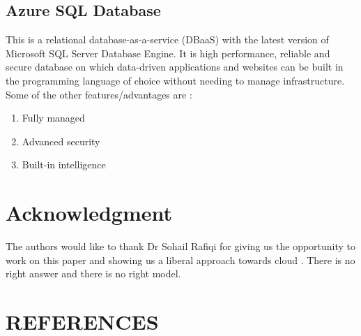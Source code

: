 \documentclass[journal]{hybrid-cloud}
\begin{document}
\subsection{Azure SQL Database}
This is a relational database-as-a-service (DBaaS) with the latest version of Microsoft SQL Server Database Engine. It is high performance, reliable and secure database on which data-driven applications and websites can be built in the programming language of choice without needing to manage infrastructure. Some of the other features/advantages are :

\begin{enumerate}
	\item Fully managed
	\item Advanced security
	\item Built-in intelligence
\end{enumerate}



\section*{Acknowledgment}


The authors would like to thank Dr Sohail Rafiqi for giving us the opportunity to work on this paper and showing us a liberal approach towards cloud . There is no right answer and there is no right model. 

\ifCLASSOPTIONcaptionsoff
  \newpage
\fi





\section{REFERENCES}
\end{document}
